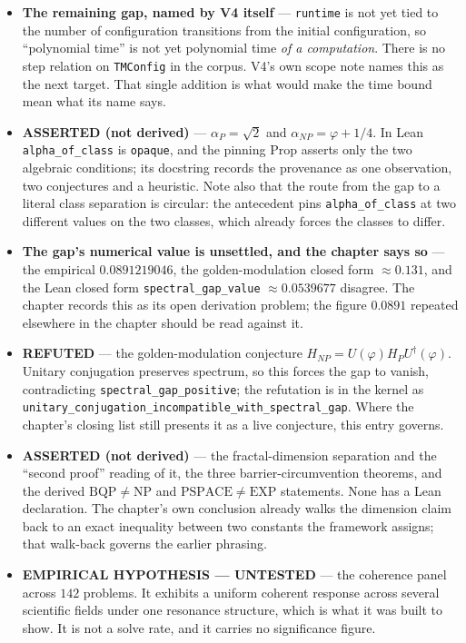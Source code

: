 \begin{itemize}
\item \textbf{The remaining gap, named by V4 itself} --- \texttt{runtime} is
not yet tied to the number of configuration transitions from the initial
configuration, so ``polynomial time'' is not yet polynomial time \emph{of a
computation}. There is no step relation on \texttt{TMConfig} in the corpus.
V4's own scope note names this as the next target. That single addition is what
would make the time bound mean what its name says.

\item \textbf{ASSERTED (not derived)} --- $\alpha_P = \sqrt 2$ and
$\alpha_{NP} = \varphi + 1/4$. In Lean \texttt{alpha\_of\_class} is
\texttt{opaque}, and the pinning Prop asserts only the two algebraic
conditions; its docstring records the provenance as one observation, two
conjectures and a heuristic. Note also that the route from the gap to a
literal class separation is circular: the antecedent pins
\texttt{alpha\_of\_class} at two different values on the two classes, which
already forces the classes to differ.

\item \textbf{The gap's numerical value is unsettled, and the chapter says
so} --- the empirical $0.0891219046$, the golden-modulation closed form
$\approx 0.131$, and the Lean closed form
\texttt{spectral\_gap\_value} $\approx 0.0539677$ disagree. The chapter records
this as its open derivation problem; the figure $0.0891$ repeated elsewhere in
the chapter should be read against it.

\item \textbf{REFUTED} --- the golden-modulation conjecture
$H_{NP} = U(\varphi) H_P U^\dagger(\varphi)$. Unitary conjugation preserves
spectrum, so this forces the gap to vanish, contradicting
\texttt{spectral\_gap\_positive}; the refutation is in the kernel as
\texttt{unitary\_conjugation\_incompatible\_with\_spectral\_gap}. Where the
chapter's closing list still presents it as a live conjecture, this entry
governs.

\item \textbf{ASSERTED (not derived)} --- the fractal-dimension separation and
the ``second proof'' reading of it, the three barrier-circumvention theorems,
and the derived $\mathrm{BQP} \neq \mathrm{NP}$ and
$\mathrm{PSPACE} \neq \mathrm{EXP}$ statements. None has a Lean declaration.
The chapter's own conclusion already walks the dimension claim back to an
exact inequality between two constants the framework assigns; that walk-back
governs the earlier phrasing.

\item \textbf{EMPIRICAL HYPOTHESIS --- UNTESTED} --- the coherence panel across
$142$ problems. It exhibits a uniform coherent response across several
scientific fields under one resonance structure, which is what it was built to
show. It is not a solve rate, and it carries no significance figure.

\end{itemize}

